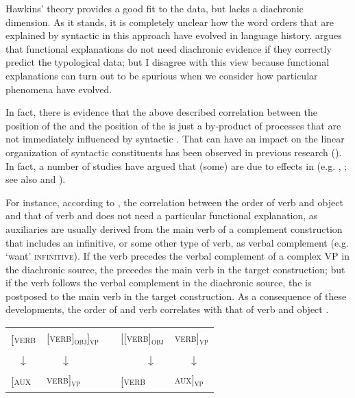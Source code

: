 \documentclass[output=paper]{langsci/langscibook}
\begin{document}
Hawkins’ theory provides a good fit to the data, but lacks a diachronic dimension. As it stands, it is completely unclear how the word orders that are explained by syntactic  in this approach have evolved in language history.  argues that functional explanations do not need diachronic evidence if they correctly predict the typological data; but I disagree with this view because functional explanations can turn out to be spurious when we consider how particular phenomena have evolved.

In fact, there is evidence that the above described correlation between the position of the  and the position of the  is just a by-product of  processes that are not immediately influenced by syntactic . That  can have an impact on the linear organization of syntactic constituents has been observed in previous research (\citealt{Li1974_Chin}). In fact, a number of studies have argued that (some)  are due to  effects in  (e.g. \citealt{Givón1975}, \citealt{Aristar1991,Bybee2010,Collins2012}; see also  and ). 

\largerpage

For instance, according to \citet[111]{Bybee2010}, the correlation between the order of verb and object and that of verb and  does not need a particular functional explanation, as auxiliaries are usually derived from the main verb of a complement construction that includes an infinitive, or some other type of verb, as verbal complement (e.g. `want' \textsc{infinitive}). If the verb precedes the verbal complement of a complex VP in the diachronic source, the  precedes the main verb in the target construction; but if the verb follows the verbal complement in the diachronic source, the  is postposed to the main verb in the target construction. As a consequence of these developments, the order of  and verb correlates with that of verb and object .

\ea\label{ex:diessel:18}
\begin{tabular}[t]{@{}llcll@{}}
{[\textsc{verb}} & {\textsc{[verb]\textsubscript{obj}]\textsubscript{vp}}} & \hspace{2cm} & {\textsc{[[verb]\textsubscript{obj}}} & {\textsc{verb]\textsubscript{vp}}} \\
\multicolumn{1}{c}{↓}  & ~~~↓ & & ~~~~~↓ & ~~~↓\\
{\textsc{[aux}}  & {\textsc{verb]\textsubscript{vp}}}                      &  & {\textsc{[verb}}  & {\textsc{aux]\textsubscript{vp}}}\\
\end{tabular}
\z
\end{document}
